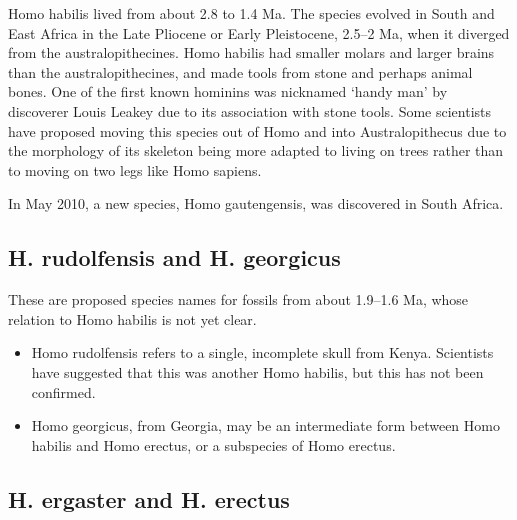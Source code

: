 Homo habilis lived from about 2.8 to 1.4 Ma. The species evolved in South and East Africa in the Late Pliocene or Early Pleistocene, 2.5--2 Ma, when it diverged from the australopithecines. Homo habilis had smaller molars and larger brains than the australopithecines, and made tools from stone and perhaps animal bones. One of the first known hominins was nicknamed `handy man' by discoverer Louis Leakey due to its association with stone tools. Some scientists have proposed moving this species out of Homo and into Australopithecus due to the morphology of its skeleton being more adapted to living on trees rather than to moving on two legs like Homo sapiens.

In May 2010, a new species, Homo gautengensis, was discovered in South Africa.

\hypertarget{h.-rudolfensis-and-h.-georgicus}{%
\subsection{H. rudolfensis and H. georgicus}\label{h.-rudolfensis-and-h.-georgicus}}

These are proposed species names for fossils from about 1.9--1.6 Ma, whose relation to Homo habilis is not yet clear.

\begin{itemize}
\tightlist
\item
  Homo rudolfensis refers to a single, incomplete skull from Kenya. Scientists have suggested that this was another Homo habilis, but this has not been confirmed.
\item
  Homo georgicus, from Georgia, may be an intermediate form between Homo habilis and Homo erectus, or a subspecies of Homo erectus.
\end{itemize}

\hypertarget{h.-ergaster-and-h.-erectus}{%
\subsection{H. ergaster and H. erectus}\label{h.-ergaster-and-h.-erectus}}


